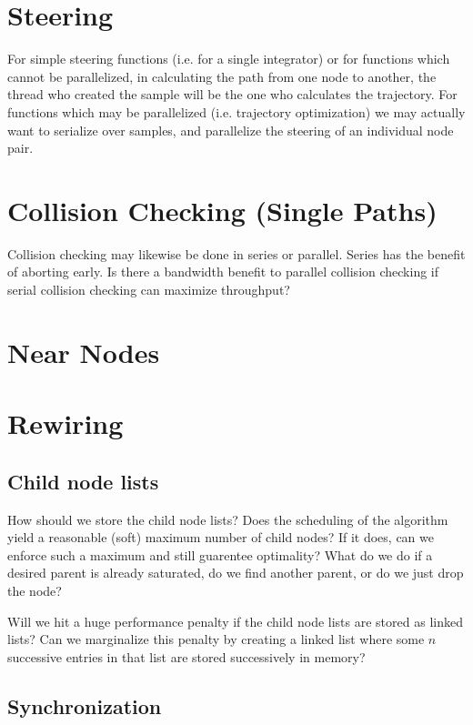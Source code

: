 \section{Steering}

For simple steering functions (i.e. for a single integrator) or for functions which cannot be parallelized, in calculating the path from one node to another, the thread who created the sample will be the one who calculates the trajectory. For functions which may be parallelized (i.e. trajectory optimization) we may actually want to serialize over samples, and parallelize the steering of an individual node pair.

\section{Collision Checking (Single Paths)}

Collision checking may likewise be done in series or parallel. Series has the benefit of aborting early. Is there a bandwidth benefit to parallel collision checking if serial collision checking can maximize throughput?


\section{Near Nodes}

\section{Rewiring}



\subsection{Child node lists}

How should we store the child node lists? Does the scheduling of the algorithm yield a reasonable (soft) maximum number of child nodes? If it does, can we enforce such a maximum and still guarentee optimality? What do we do if a desired parent is already saturated, do we find another parent, or do we just drop the node?

Will we hit a huge performance penalty if the child node lists are stored as linked lists? Can we marginalize this penalty by creating a linked list where some $n$ successive entries in that list are stored successively in memory?

\subsection{Synchronization}

